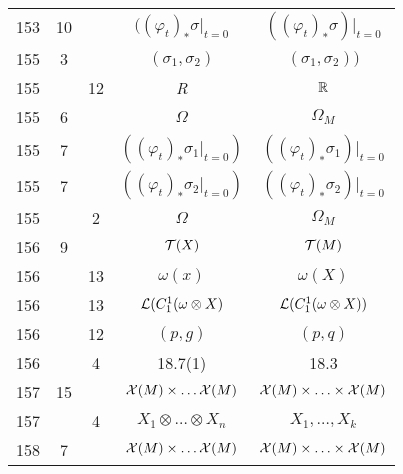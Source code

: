 \documentclass[a4paper,11pt]{article}
\begin{document}
\begin{center}
\begin{tabular}{|c|c|c|c|c|}
    153 & 10 & & $( ( \varphi_{ t } )_{ * } \sigma \bigg|_{ t = 0 }$
           & $( ( \varphi_{ t } )_{ * } \sigma )\bigg|_{ t = 0 }$ \\
    155 &  3 & & $( \sigma_{ 1 }, \sigma_{ 2 } )$
           & $( \sigma_{ 1 }, \sigma_{ 2 } ) )$ \\
    155 & & 12 & \textit{R} & $\mathbb{R}$ \\
    155 &  6 & & $\Omega$ & $\Omega_{ M }$ \\
    155 &  7 & & $( ( \varphi_{ t } )_{ * } \sigma_{ 1 }
                 \bigg|_{ t = 0 } )$
           & $( ( \varphi_{ t } )_{ * } \sigma_{ 1 }
             )\bigg|_{ t = 0 }$ \\
    155 &  7 & & $( ( \varphi_{ t } )_{ * } \sigma_{ 2 }
                 \bigg|_{ t = 0 } )$
           & $( ( \varphi_{ t } )_{ * } \sigma_{ 2 }
             )\bigg|_{ t = 0 }$ \\
    155 & &  2 & $\Omega$ & $\Omega_{ M }$ \\
    156 &  9 & & $\mathcal{T}( X )$ & $\mathcal{T}( M )$ \\
    156 & & 13 & $\omega( x )$ & $\omega( X )$ \\
    156 & & 13 & $\mathcal{L}( C^{ 1 }_{ 1 }( \omega \otimes X )$
           & $\mathcal{L}( C^{ 1 }_{ 1 }( \omega \otimes X ) )$ \\
    156 & & 12 & $( p, g )$ & $( p, q )$ \\
    156 & &  4 & 18.7(1) & 18.3 \\
    157 & 15 & & $\mathcal{X}( M ) \times \ldots \mathcal{X}( M )$
           & $\mathcal{X}( M ) \times \ldots \times \mathcal{X}( M )$ \\
    157 & &  4 & $X_{ 1 } \otimes \ldots \otimes X_{ n }$
           & $X_{ 1 }, \ldots, X_{ k }$ \\
    158 &  7 & & $\mathcal{X}( M ) \times \ldots \mathcal{X}( M )$
           & $\mathcal{X}( M ) \times \ldots \times \mathcal{X}( M )$ \\
    \hline
  \end{tabular}






\end{center}
\end{document}

